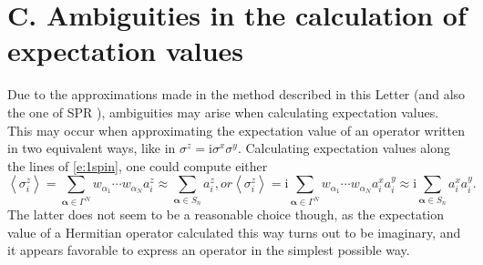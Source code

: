 \documentclass[aps,prl,showpacs,amsmath,amssymb,superscriptaddress,reprint,10pt]{revtex4-1}
\newcommand\ii{{\mathrm{i}}}
\newcommand{\mvec}[1]{\boldsymbol #1}
\begin{document}
\section{C. Ambiguities in the calculation of expectation values}
\setcounter{section}{3}
\setcounter{equation}{0}
\setcounter{figure}{0}

Due to the approximations made in the method described in this Letter (and also the one of SPR \cite{Schachenmayer_etal15}), ambiguities may arise when calculating expectation values. This may occur when approximating the expectation value of an operator written in two equivalent ways, like in $\sigma^z=\ii\sigma^x\sigma^y$. Calculating expectation values along the lines of \eqref{e:1spin}, one could compute either
\begin{subequations}
\begin{equation}
\left\langle\sigma_i^z\right\rangle =\sum_{\mvec{\alpha}\in\Gamma^N}w_{\alpha_1}\cdots w_{\alpha_N} a_i^z \approx \sum_{\mvec{\alpha}\in S_n}a_i^z,
\end{equation}
or
\begin{equation}
\left\langle\sigma_i^z\right\rangle =\ii\sum_{\mvec{\alpha}\in\Gamma^N}w_{\alpha_1}\cdots w_{\alpha_N} a_i^x a_i^y \approx \ii\sum_{\mvec{\alpha}\in S_n}a_i^x a_i^y.
\end{equation}
\end{subequations}
The latter does not seem to be a reasonable choice though, as the expectation value of a Hermitian operator calculated this way turns out to be imaginary, and it appears favorable to express an operator in the simplest possible way.
\end{document}
